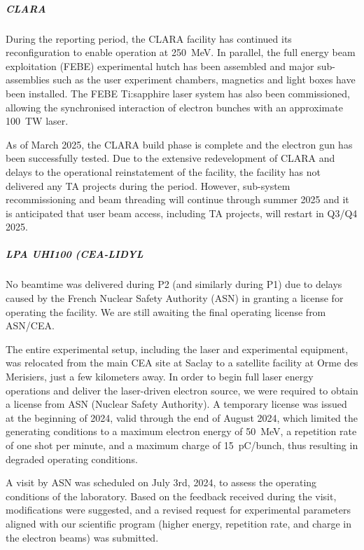 {%

\subparagraph{CLARA}
 
During the reporting period, the CLARA facility has continued its reconfiguration to enable operation at \SI{250}{MeV}. 
In parallel, the full energy beam exploitation (FEBE) experimental hutch has been assembled and major sub-assemblies such as the user experiment chambers, magnetics and light boxes have been installed. The FEBE Ti:sapphire laser system has also been commissioned, allowing the synchronised interaction of electron bunches with an approximate \SI{100}{TW} laser. 

As of March 2025, the CLARA build phase is complete and the electron gun has been successfully tested. Due to the extensive redevelopment of CLARA and delays to the operational reinstatement of the facility, the facility has not delivered any TA projects during the period. However, sub-system recommissioning and beam threading will continue through summer 2025 and it is anticipated that user beam access, including TA projects, will restart in Q3/Q4 2025.


\subparagraph{LPA UHI100 (CEA-LIDYL} 

No beamtime was delivered during P2 (and similarly during P1) due to delays caused by the French Nuclear Safety Authority (ASN) in granting a license for operating the facility. We are still awaiting the final operating license from ASN/CEA.

The entire experimental setup, including the laser and experimental equipment, was relocated from the main CEA site at Saclay to a satellite facility at Orme des Merisiers, just a few kilometers away. In order to begin full laser energy operations and deliver the laser-driven electron source, we were required to obtain a license from ASN (Nuclear Safety Authority). A temporary license was issued at the beginning of 2024, valid through the end of August 2024, which limited the generating conditions to a maximum electron energy of \SI{50}{MeV}, a repetition rate of one shot per minute, and a maximum charge of \SI{15}{\pico C/bunch}, thus resulting in degraded operating conditions.

A visit by ASN was scheduled on July 3rd, 2024, to assess the operating conditions of the laboratory. Based on the feedback received during the visit, modifications were suggested, and a revised request for experimental parameters aligned with our scientific program (higher energy, repetition rate, and charge in the electron beams) was submitted.

}
